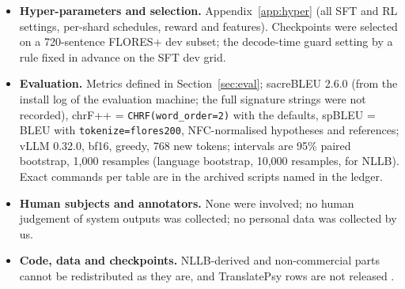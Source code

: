\begin{itemize}
\item \textbf{Hyper-parameters and selection.} Appendix~\ref{app:hyper} (all SFT and RL settings, per-shard schedules, reward and features). Checkpoints were selected on a 720-sentence FLORES+ dev subset; the decode-time guard setting by a rule fixed in advance on the SFT dev grid.
\item \textbf{Evaluation.} Metrics defined in Section~\ref{sec:eval}; sacreBLEU 2.6.0 (from the install log of the evaluation machine; the full signature strings were not recorded), chrF++ = \texttt{CHRF(word\_order=2)} with the defaults, spBLEU = BLEU with \texttt{tokenize=flores200}, NFC-normalised hypotheses and references; vLLM 0.32.0, bf16, greedy, 768 new tokens; intervals are 95\% paired bootstrap, 1,000 resamples (language bootstrap, 10,000 resamples, for NLLB). Exact commands per table are in the archived scripts named in the ledger.
\item \textbf{Human subjects and annotators.} None were involved; no human judgement of system outputs was collected; no personal data was collected by us.
\item \textbf{Code, data and checkpoints.}  NLLB-derived and non-commercial parts cannot be redistributed as they are, and TranslatePsy rows are not released .
\end{itemize}

